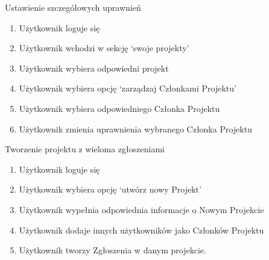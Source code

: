 \begin{usecase}{Ustawienie szczegółowych uprawnień}
	\begin{enumerate}
    \item Użytkownik loguje się
    \item Użytkownik wchodzi w sekcję ‘swoje projekty’
    \item Użytkownik wybiera odpowiedni projekt
    \item Użytkownik wybiera opcję ‘zarządzaj Członkami Projektu’
    \item Użytkownik wybiera odpowiedniego Członka Projektu
    \item Użytkownik zmienia uprawnienia wybranego Członka Projektu
	\end{enumerate}
\end{usecase}

\begin{usecase}{Tworzenie projektu z wieloma zgłoszeniami}
	\begin{enumerate}
    \item Użytkownik loguje się
    \item Użytkownik wybiera opcję ‘utwórz nowy Projekt’
    \item Użytkownik wypełnia odpowiednia informacje o Nowym Projekcie
    \item Użytkownik dodaje innych użytkowników jako Członków Projektu
    \item Użytkownik tworzy Zgłoszenia w danym projekcie.
	\end{enumerate}
\end{usecase}

